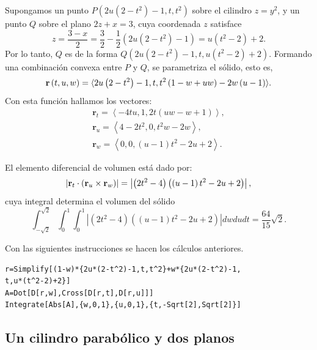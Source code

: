 Supongamos un punto $P\left( 2u\left( 2-t^2\right) -1,t,t^2\right) $ sobre el cilindro $z=y^2$,
y un punto $Q$ sobre el plano $2z+x=3$, cuya coordenada $z$ satisface
%
\[
z = \frac{3 - x}{2} = \frac{3}{2} - \frac{1}{2} \left(2u \left(2 - t^2\right) - 1\right) = u\left(t^2 - 2\right) + 2.
\]
%
Por lo tanto, $Q$ es de la forma $Q( 2u\left( 2-t^2\right) -1,t,u\left( t^2-2\right)+2)$. Formando una combinación convexa entre $P$ y $Q$, se parametriza el sólido, esto es,
%
\begin{equation*}
{\bf r}\left( t,u,w\right) = \langle 2u\left( 2-t^2\right)-1,t,t^2\left( 1-w+uw\right) -2w\left( u-1\right) \rangle.
\end{equation*}
%
Con esta función hallamos los vectores:
\begin{gather*}
\mathbf{r}_{t} = \left\langle -4tu,1,2t\left( uw-w+1\right) \right\rangle\!, \\
\mathbf{r}_{u} = \left\langle 4-2t^2,0,t^2w-2w\right\rangle\!, \\
\mathbf{r}_{w} = \left\langle 0,0,\left( u-1\right) t^2-2u+2\right\rangle\!.
\end{gather*}

El elemento diferencial de volumen está dado por:
\[\left\vert {\bf r}_{t}\cdot \left( {\bf r}_{u}\times {\bf r}_{w}\right) \right\vert
=\left\vert \left( 2t^2-4\right) \left( \left( u-1\right)t^2-2u+2\right) \right\vert,\]
cuya integral determina el volumen del sólido
%
\[\int_{-\sqrt{2}}^{\sqrt{2}}\int_{0}^{1}\int_{0}^{1}\left\vert \left(2t^2-4\right) \left( \left( u-1\right) t^2-2u+2\right) \right\vert dwdudt= \frac{64}{15}\sqrt{2}.\]
%

Con las siguientes instrucciones se hacen los cálculos anteriores.
%

\begin{tcolorbox}[title=\bf Instrucción en \verb"Mathematica"]\begin{Verbatim}[formatcom=\letraverbatim]
r=Simplify[(1-w)*{2u*(2-t^2)-1,t,t^2}+w*{2u*(2-t^2)-1,
t,u*(t^2-2)+2}]
A=Dot[D[r,w],Cross[D[r,t],D[r,u]]]
Integrate[Abs[A],{w,0,1},{u,0,1},{t,-Sqrt[2],Sqrt[2]}]
\end{Verbatim}
\end{tcolorbox}

\subsection{Un cilindro parabólico y dos planos}

